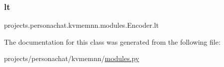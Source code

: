 \subsubsection{\texorpdfstring{lt}{lt}}
{\footnotesize\ttfamily projects.\+personachat.\+kvmemnn.\+modules.\+Encoder.\+lt}



The documentation for this class was generated from the following file\+:\begin{DoxyCompactItemize}
\item 
projects/personachat/kvmemnn/\hyperlink{projects_2personachat_2kvmemnn_2modules_8py}{modules.\+py}\end{DoxyCompactItemize}
